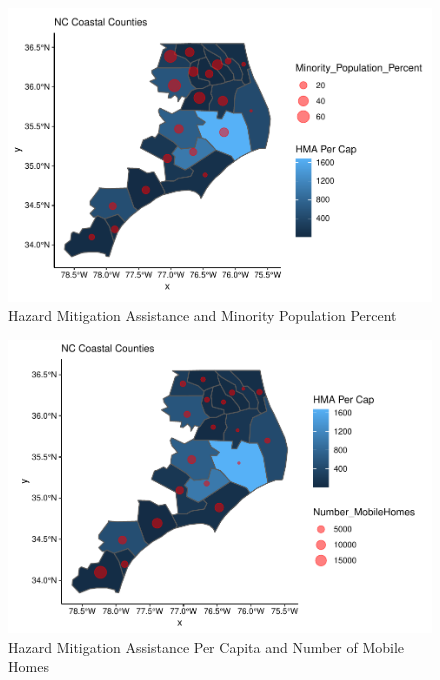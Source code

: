 \documentclass[
  12pt,
]{article}
\begin{document}
\begin{figure}
\centering
\includegraphics{Alexander_ENV872_Project_files/figure-latex/map1-1.pdf}
\caption{Hazard Mitigation Assistance and Minority Population Percent}
\end{figure}

\begin{figure}
\centering
\includegraphics{Alexander_ENV872_Project_files/figure-latex/map2-1.pdf}
\caption{Hazard Mitigation Assistance Per Capita and Number of Mobile
Homes}
\end{figure}
\end{document}
